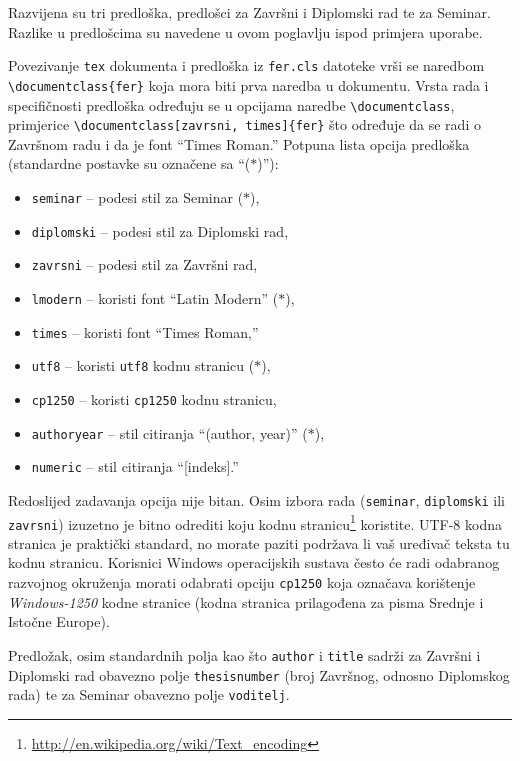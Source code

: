 \documentclass[zavrsni, lmodern, utf8]{fer}
\begin{document}
Razvijena su tri predloška, predlošci za Završni i Diplomski rad te za Seminar.
Razlike u predlošcima su navedene u ovom poglavlju ispod primjera uporabe.

Povezivanje \texttt{tex} dokumenta i predloška iz \texttt{fer.cls} datoteke
vrši se naredbom \verb|\documentclass{fer}| koja mora biti prva naredba u
dokumentu. Vrsta rada i specifičnosti predloška određuju se u opcijama naredbe
\verb|\documentclass|, primjerice \verb|\documentclass[zavrsni, times]{fer}|
što određuje da se radi o Završnom radu i da je font ``Times Roman.''
Potpuna lista opcija predloška (standardne postavke su označene sa ``($\ast$)''):
\begin{itemize}
	\item \texttt{seminar} -- podesi stil za Seminar ($\ast$),
	\item \texttt{diplomski} -- podesi stil za Diplomski rad,
	\item \texttt{zavrsni} -- podesi stil za Završni rad,
	\item \texttt{lmodern} -- koristi font ``Latin Modern'' ($\ast$),
	\item \texttt{times} -- koristi font ``Times Roman,''
	\item \texttt{utf8} -- koristi \texttt{utf8} kodnu stranicu ($\ast$),
	\item \texttt{cp1250} -- koristi \texttt{cp1250} kodnu stranicu,
	\item \texttt{authoryear} -- stil citiranja ``(author, year)'' ($\ast$),
	\item \texttt{numeric} -- stil citiranja ``[indeks].''
\end{itemize}
Redoslijed zadavanja opcija nije bitan. Osim izbora rada (\texttt{seminar},
\texttt{diplomski} ili \texttt{zavrsni}) izuzetno je bitno odrediti koju
kodnu stranicu\footnote{\url{http://en.wikipedia.org/wiki/Text_encoding}}
koristite. UTF-8 kodna stranica je praktički standard, no morate paziti
podržava li vaš uređivač teksta tu kodnu stranicu. Korisnici Windows
operacijskih sustava često će radi odabranog razvojnog okruženja morati
odabrati opciju \texttt{cp1250} koja označava korištenje \emph{Windows-1250}
kodne stranice (kodna stranica prilagođena za pisma Srednje i Istočne Europe).

Predložak, osim standardnih polja kao što \texttt{author} i \texttt{title}
sadrži za Završni i Diplomski rad obavezno polje \texttt{thesisnumber} (broj Završnog, odnosno Diplomskog rada)
te za Seminar obavezno polje \texttt{voditelj}.
\end{document}

